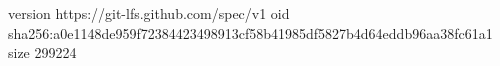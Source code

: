 version https://git-lfs.github.com/spec/v1
oid sha256:a0e1148de959f72384423498913cf58b41985df5827b4d64eddb96aa38fc61a1
size 299224
